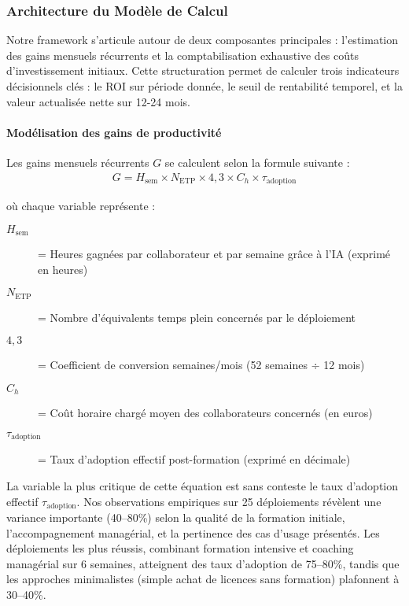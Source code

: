 \subsubsection{Architecture du Modèle de Calcul}

Notre framework s'articule autour de deux composantes principales : l'estimation des gains mensuels récurrents et la comptabilisation exhaustive des coûts d'investissement initiaux. Cette structuration permet de calculer trois indicateurs décisionnels clés : le ROI sur période donnée, le seuil de rentabilité temporel, et la valeur actualisée nette sur 12-24 mois.

\paragraph{Modélisation des gains de productivité}

Les gains mensuels récurrents $G$ se calculent selon la formule suivante :
\begin{align}
G = H_{\text{sem}} \times N_{\text{ETP}} \times 4{,}3 \times C_h \times \tau_{\text{adoption}}
\end{align}

où chaque variable représente :
\begin{description}
    \item[$H_{\text{sem}}$] = Heures gagnées par collaborateur et par semaine grâce à l'IA (exprimé en heures)
    \item[$N_{\text{ETP}}$] = Nombre d'équivalents temps plein concernés par le déploiement
    \item[$4{,}3$] = Coefficient de conversion semaines/mois (52 semaines ÷ 12 mois)
    \item[$C_h$] = Coût horaire chargé moyen des collaborateurs concernés (en euros)
    \item[$\tau_{\text{adoption}}$] = Taux d'adoption effectif post-formation (exprimé en décimale)
\end{description}
\medskip
La variable la plus critique de cette équation est sans conteste le taux d'adoption effectif $\tau_{\text{adoption}}$. Nos observations empiriques sur 25 déploiements révèlent une variance importante (40--80\%) selon la qualité de la formation initiale, l'accompagnement managérial, et la pertinence des cas d'usage présentés. Les déploiements les plus réussis, combinant formation intensive et coaching managérial sur 6 semaines, atteignent des taux d'adoption de 75--80\%, tandis que les approches minimalistes (simple achat de licences sans formation) plafonnent à 30--40\%.

